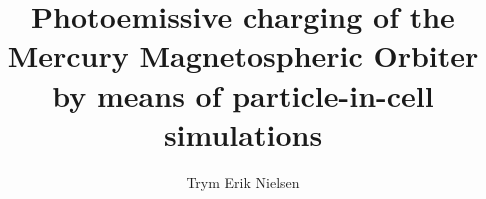 \documentclass[a4paper, american]{memoir}
\title{Photoemissive charging of the Mercury Magnetospheric Orbiter by means of particle-in-cell simulations}
\author{Trym Erik Nielsen}
\begin{document}
    \frontmatter        %

    \masterfrontpage
    
    
    

    \cleartorecto
    \tableofcontents    %
    \cleartorecto
    \listoffigures      %
    \cleartorecto
    \listoftables       %

    \mainmatter         %

    
    
    
    
    
    
    

    \appendix           %
    \appendixpage       %

    
    

    \backmatter         %

    \printbibliography
\end{document}
